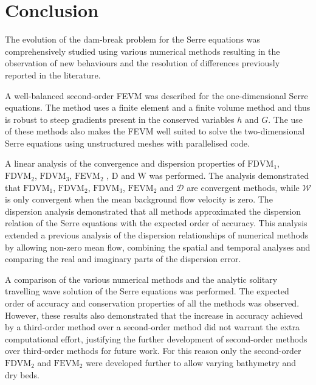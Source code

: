 
\chapter{Conclusion}
\label{chp:Conclusion}



The evolution of the dam-break problem for the Serre equations was comprehensively studied using various numerical methods resulting in the observation of new behaviours and the resolution of differences previously reported in the literature.  

A well-balanced second-order FEVM was described for the one-dimensional Serre equations. The method uses a finite element and a finite volume method and thus is robust to steep gradients present in the conserved variables $h$ and $G$. The use of these methods also makes the FEVM well suited to solve the two-dimensional Serre equations using unstructured meshes with parallelised code.  

A linear analysis of the convergence and dispersion properties of $\text{FDVM}_1$, $\text{FDVM}_2$, $\text{FDVM}_3$, $\text{FEVM}_2$ , $\text{D}$ and $\text{W}$ was performed. The analysis demonstrated that $\text{FDVM}_1$, $\text{FDVM}_2$, $\text{FDVM}_3$, $\text{FEVM}_2$ and $\mathcal{D}$ are convergent methods, while $\mathcal{W}$ is only convergent when the mean background flow velocity is zero. The dispersion analysis demonstrated that all methods approximated the dispersion relation of the Serre equations with the expected order of accuracy. This analysis extended a previous analysis of the dispersion relationships of numerical methods \cite{Filippini-etal-2016-381} by allowing non-zero mean flow, combining the spatial and temporal analyses and comparing the real and imaginary parts of the dispersion error. 

A comparison of the various numerical methods and the analytic solitary travelling wave solution of the Serre equations was performed. The expected order of accuracy and conservation properties of all the methods was observed. However, these results also demonstrated that the increase in accuracy achieved by a third-order method over a second-order method did not warrant the extra computational effort, justifying the further development of second-order methods over third-order methods for future work. For this reason only the second-order $\text{FDVM}_2$ and $\text{FEVM}_2$ were developed further to allow varying bathymetry and dry beds.

